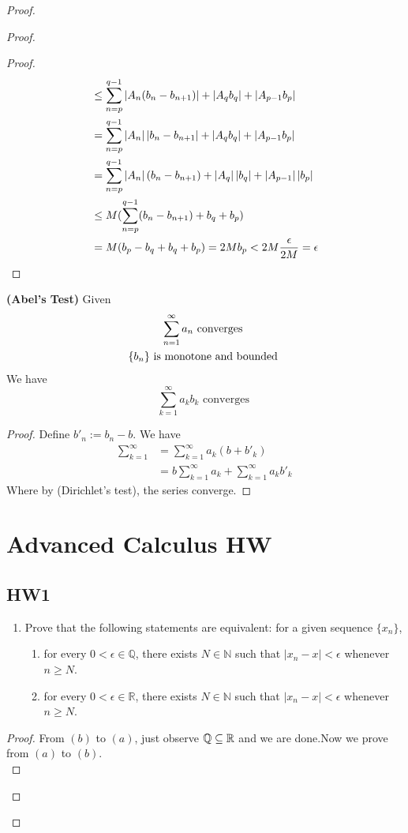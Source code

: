 \documentclass{report}
\begin{document}
\begin{proof}
\begin{proof}
\begin{proof}
\begin{align}
&\leq \sum_{n=p}^{q-1}\left|A_n(b_n-b_{n+1})\right|+\left|A_qb_q\right|+\left|A_{p-1}b_p\right|\\
&=\sum_{n=p}^{q-1} \left|A_n\right|\left|b_n-b_{n+1}\right|+\left|A_qb_q\right|+\left|A_{p-1}b_p\right|\\
&=\sum_{n=p}^{q-1}\left|A_n\right|(b_n-b_{n+1})+\left|A_q\right|\left|b_q\right|+\left|A_{p-1}\right|\left|b_p\right|\\
&\leq M(\sum_{n=p}^{q-1}(b_n-b_{n+1})+b_q+b_p)\\
&=M(b_p-b_q+b_q+b_p)=2Mb_p<2M \frac{\epsilon }{2M}=\epsilon 
\end{align}
\end{proof}
\begin{theorem}
\label{2.5.6}
\textbf{(Abel's Test)}
Given 
\begin{gather}
\sum_{n=1}^\infty a_n\text{ converges }\\
\{ b_n \}\text{ is monotone and bounded }
\end{gather}
We have
\begin{equation}
\sum_{k=1}^\infty a_kb_k\text{ converges }
\end{equation}
\end{theorem}
\begin{proof}
Define $b'_n:=b_n-b$. We have
 \begin{align}
\sum_{k=1}^\infty &=\sum_{k=1}^\infty a_k(b+b'_k)\\
&=b\sum_{k=1}^\infty a_k+\sum_{k=1}^\infty a_kb'_k
\end{align}
Where by   (Dirichlet's test), the series converge.
\end{proof}

\chapter{Advanced Calculus HW}
\section{HW1}
\begin{question}{}{}
\begin{enumerate}
    \item Prove that the following statements are equivalent: for a given sequence $\{x_n\}$,
    \begin{enumerate}
        \item for every $0 < \epsilon \in \mathbb{Q}$, there exists $N \in \mathbb{N}$ such that $|x_n - x| < \epsilon$ whenever $n \geq N$.
        \item for every $0 < \epsilon \in \mathbb{R}$, there exists $N \in \mathbb{N}$ such that $|x_n - x| < \epsilon$ whenever $n \geq N$.
    \end{enumerate}
\end{enumerate}
\end{question}
\begin{proof}
From $(b)$ to $(a)$, just observe  $\mathbb{Q} \subseteq \mathbb{R}$ and we are done.Now we prove from $(a)$ to $(b)$.\\


\end{proof}
\end{proof}
\end{proof}
\end{document}
